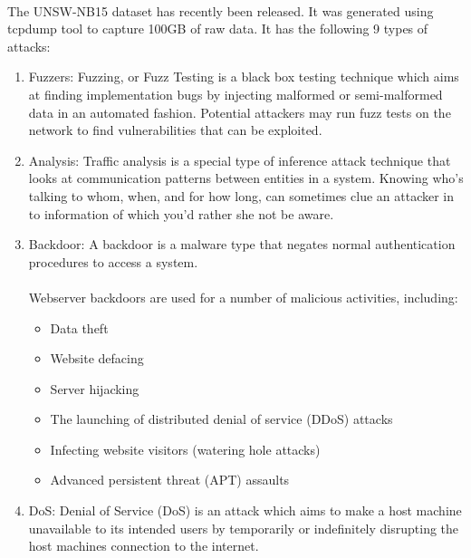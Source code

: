 \documentclass[a4paper,12pt]{article}
\begin{document}
            \paragraph{}
                The UNSW-NB15 dataset has recently been released. It was generated using tcpdump tool to capture 100GB of raw data. It has the following 9 types of attacks:
                \begin{enumerate}
                    \item Fuzzers: Fuzzing, or Fuzz Testing is a black box testing technique which aims at finding implementation bugs by injecting malformed or semi-malformed data in an automated fashion. Potential attackers may run fuzz tests on the network to find vulnerabilities that can be exploited.
                    \item Analysis: Traffic analysis is a special type of inference attack technique that looks at communication patterns between entities in a system. Knowing who's talking to whom, when, and for how long, can sometimes clue an attacker in to information of which you'd rather she not be aware.
                    \item Backdoor: A backdoor is a malware type that negates normal authentication procedures to access a system.\\\\
                    Webserver backdoors are used for a number of malicious activities, including:
                    \begin{itemize}
                        \item Data theft
                        \item Website defacing
                        \item Server hijacking
                        \item The launching of distributed denial of service (DDoS) attacks
                        \item Infecting website visitors (watering hole attacks)
                        \item Advanced persistent threat (APT) assaults
                    \end{itemize}
                    \item DoS: Denial of Service (DoS) is an attack which aims to make a host machine unavailable to its intended users by temporarily or indefinitely disrupting the host machines connection to the internet. \\\\

\end{enumerate}
\end{document}
